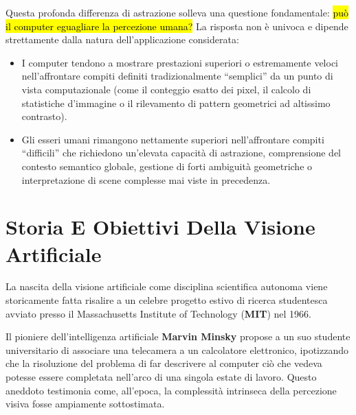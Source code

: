 ﻿\documentclass[11pt, a4paper]{article}
\begin{document}

Questa profonda differenza di astrazione solleva una questione fondamentale: \hl{può il computer eguagliare la percezione umana?} La risposta non è univoca e dipende strettamente dalla natura dell'applicazione considerata:
\begin{itemize}[noitemsep]
    \item I computer tendono a mostrare prestazioni superiori o estremamente veloci nell'affrontare compiti definiti tradizionalmente \enquote{semplici} da un punto di vista computazionale (come il conteggio esatto dei pixel, il calcolo di statistiche d'immagine o il rilevamento di pattern geometrici ad altissimo contrasto).
    \item Gli esseri umani rimangono nettamente superiori nell'affrontare compiti \enquote{difficili} che richiedono un'elevata capacità di astrazione, comprensione del contesto semantico globale, gestione di forti ambiguità geometriche o interpretazione di scene complesse mai viste in precedenza.
\end{itemize}

\newpage

\section{Storia E Obiettivi Della Visione Artificiale}

La nascita della visione artificiale come disciplina scientifica autonoma viene storicamente fatta risalire a un celebre progetto estivo di ricerca studentesca avviato presso il Massachusetts Institute of Technology (\textbf{MIT}) nel 1966.

Il pioniere dell'intelligenza artificiale \textbf{Marvin Minsky} propose a un suo studente universitario di associare una telecamera a un calcolatore elettronico, ipotizzando che la risoluzione del problema di far descrivere al computer ciò che vedeva potesse essere completata nell'arco di una singola estate di lavoro. Questo aneddoto testimonia come, all'epoca, la complessità intrinseca della percezione visiva fosse ampiamente sottostimata.

\end{document}
